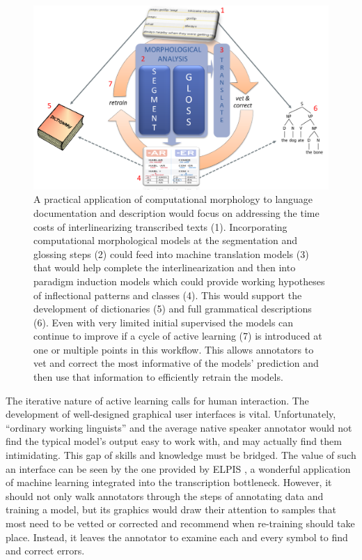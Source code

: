 \documentclass[12pt]{article}
\begin{document}
\begin{figure}[ht]
\label{fig:ML-LDD}
\begin{center}
\includegraphics[width=0.75\columnwidth]{ML-LDD.PNG}
\caption{A practical application of computational morphology to language documentation and description would focus on addressing the time costs of interlinearizing transcribed texts (1). Incorporating computational morphological models at the segmentation and glossing steps (2) could feed into machine translation models (3) that would help complete the interlinearization and then into paradigm induction models which could provide working hypotheses of inflectional patterns and classes (4). This would support the development of dictionaries (5) and full grammatical descriptions (6). Even with very limited initial supervised the models can continue to improve if a cycle of active learning (7) is introduced at one or multiple points in this workflow. This allows annotators to vet and correct the most informative of the models' prediction and then use that information to efficiently retrain the models.}
\end{center}
\end{figure}

The iterative nature of active learning calls for human interaction. The development of well-designed graphical user interfaces is vital. Unfortunately, ``ordinary working linguists'' and the average native speaker annotator would not find the typical model's output easy to work with, and may actually find them intimidating. 
This gap of skills and knowledge must be bridged. 
The value of such an interface can be seen by the one provided by ELPIS \cite{foley_elpis_2018}, a wonderful application of machine learning integrated into the transcription bottleneck. However, it should not only walk annotators through the steps of annotating data and training a model, but its graphics would draw their attention to samples that most need to be vetted or corrected and recommend when re-training should take place.
Instead, it leaves the annotator to examine each and every symbol to find and correct errors. 
\end{document}
